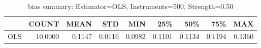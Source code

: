 \begin{table}[ht]
\centering
\caption{bias summary: Estimator=OLS, Instruments=500, Strength=0.50}
\begin{tabular}{lrrrrrrrr}
\toprule
 & COUNT & MEAN & STD & MIN & 25\% & 50\% & 75\% & MAX \\
\midrule
OLS & 10.0000 & 0.1147 & 0.0116 & 0.0982 & 0.1101 & 0.1134 & 0.1194 & 0.1360 \\
\bottomrule
\end{tabular}
\end{table}
